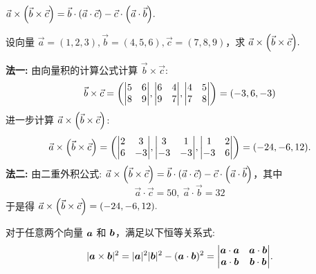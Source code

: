 \begin{theorem}[二重外积公式]
    $\vec{a}\times\qty(\vec{b}\times\vec{c})=\vec{b}\cdot\qty(\vec{a}\cdot\vec{c})-\vec{c}\cdot\qty(\vec{a}\cdot\vec{b}).$
\end{theorem}

\begin{example}[2023 四川大学]
    设向量 $\vec{a}=(1,2,3),\vec{b}=(4,5,6),\vec{c}=(7,8,9)$，求 $\vec{a}\times\qty(\vec{b}\times\vec{c}).$
\end{example}
\begin{solution}
    \textbf{法一: }由向量积的计算公式计算 $\vec{b}\times\vec{c}$:
    $$\vec{b}\times\vec{c}=\qty(\mqty|5&6\\8&9|,\mqty|6&4\\9&7|,\mqty|4&5\\7&8|)=(-3,6,-3)$$
    进一步计算 $\vec{a}\times\qty(\vec{b}\times\vec{c})$:
    $$\vec{a}\times\qty(\vec{b}\times\vec{c})=\qty(\mqty|2&3\\6&-3|,\mqty|3&1\\-3&-3|,\mqty|1&2\\-3&6|)=(-24,-6,12).$$
    \textbf{法二: }由二重外积公式: $\vec{a}\times\qty(\vec{b}\times\vec{c})=\vec{b}\cdot\qty(\vec{a}\cdot\vec{c})-\vec{c}\cdot\qty(\vec{a}\cdot\vec{b})$，其中
    $$\vec{a}\cdot\vec{c}=50,~\vec{a}\cdot\vec{b}=32$$
    于是得 $\vec{a}\times\qty(\vec{b}\times\vec{c})=(-24,-6,12).$
\end{solution}

\begin{theorem}
    对于任意两个向量 $\vb*{a}$ 和 $\vb*{b}$，满足以下恒等关系式:
    $$|\vb*{a} \times \vb*{b}|^{2}=|\vb*{a}|^{2}|\vb*{b}|^{2}-(\vb*{a} \cdot \vb*{b})^{2}
        =\mqty|\vb*{a} \cdot \vb*{a} & \vb*{a} \cdot \vb*{b} \\
        \vb*{a} \cdot \vb*{b} & \vb*{b} \cdot \vb*{b}|.$$
\end{theorem}

